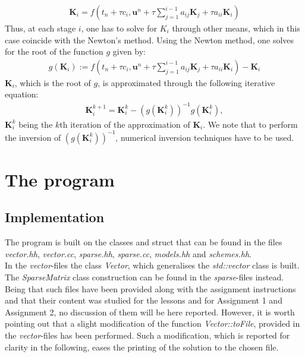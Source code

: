 \documentclass[11pt]{article}
\theoremstyle{theorem}
\theoremstyle{definition}
\begin{document}
\begin{align}
\label{eqn:K_i}
\mathbf{K}_i = f\left(t_n + \tau c_i, \mathbf{u}^n + \tau\sum_{j=1}^{i-1}a_{ij}\mathbf{K}_j + \tau a_{ii}\mathbf{K}_i\right)
\end{align}
Thus, at each stage $ i $, one has to solve for $ K_i $ through other means, which in this case coincide with the Newton's method. Using the Newton method, one solves for the root of the function $ g $ given by:
\begin{align*}
g(\mathbf{K}_i) := f\left(t_n + \tau c_i, \mathbf{u}^n + \tau\sum_{j=1}^{i-1}a_{ij}\mathbf{K}_j + \tau a_{ii}\mathbf{K}_i\right) - \mathbf{K}_i
\end{align*}
$\mathbf{K}_i $, which is the root of $g$, is approximated through the following iterative equation:
\begin{align*}
\mathbf{K}_i^{k+1} = \mathbf{K}_i^{k} - (g(\mathbf{K}_{i}^{k}))^{-1}g(\mathbf{K}_{i}^{k}),
\end{align*}
$ \mathbf{K}_i^k $ being the $ k $th iteration of the approximation of $ \mathbf{K}_i $. We note that to perform the inversion of $ (g(\mathbf{K}_{i}^{k}))^{-1} $, numerical inversion techniques have to be used.\\



\section{The program}
\subsection{Implementation}
The program is built on the classes and struct that can be found in the files \emph{vector.hh}, \emph{vector.cc}, \emph{sparse.hh}, \emph{sparse.cc}, \emph{models.hh} and \emph{schemes.hh}.\\
In the \emph{vector}-files the class \emph{Vector}, which generalises the \emph{std::vector} class is built. The \emph{SparseMatrix} class construction can be found in the \emph{sparse}-files instead. Being that such files have been provided along with the assignment instructions and that their content was studied for the lessons and for Assignment 1 and Assignment 2, no discussion of them will be here reported. However, it is worth pointing out that a slight modification of the function \emph{Vector::toFile}, provided in the \emph{vector}-files has been performed. Such a modification, which is reported for clarity in the following, eases the printing of the solution to the chosen file.\\
\end{document}
